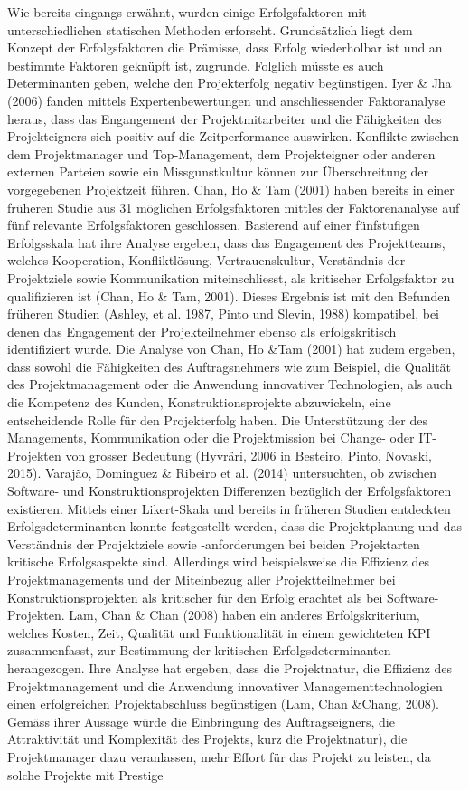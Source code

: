 \newline
Wie bereits eingangs erwähnt, wurden einige Erfolgsfaktoren mit unterschiedlichen statischen Methoden erforscht. Grundsätzlich liegt dem Konzept der Erfolgsfaktoren die Prämisse, dass Erfolg wiederholbar ist und an bestimmte Faktoren geknüpft ist, zugrunde. Folglich müsste es auch Determinanten geben, welche den Projekterfolg negativ begünstigen. Iyer \& Jha (2006) fanden mittels Expertenbewertungen und anschliessender Faktoranalyse heraus, dass das Engangement der Projektmitarbeiter und die Fähigkeiten des Projekteigners sich positiv auf die Zeitperformance auswirken. Konflikte zwischen dem Projektmanager und Top-Management, dem Projekteigner oder anderen externen Parteien sowie ein Missgunstkultur können zur Überschreitung der vorgegebenen Projektzeit führen. Chan, Ho \& Tam (2001) haben bereits in einer früheren Studie aus 31 möglichen Erfolgsfaktoren mittles der Faktorenanalyse auf fünf relevante Erfolgsfaktoren geschlossen. Basierend auf einer fünfstufigen Erfolgsskala hat ihre Analyse ergeben, dass das Engagement des Projektteams, welches Kooperation, Konfliktlösung, Vertrauenskultur, Verständnis der Projektziele sowie Kommunikation miteinschliesst, als kritischer Erfolgsfaktor zu qualifizieren ist (Chan, Ho \& Tam, 2001). Dieses Ergebnis ist mit den Befunden früheren Studien (Ashley, et al. 1987, Pinto und Slevin, 1988) kompatibel, bei denen das Engagement der Projekteilnehmer ebenso als erfolgskritisch identifiziert wurde. Die Analyse von Chan, Ho \&Tam (2001) hat zudem ergeben, dass sowohl die Fähigkeiten des Auftragsnehmers wie zum Beispiel, die Qualität des Projektmanagement oder die Anwendung innovativer Technologien, als auch die Kompetenz des Kunden, Konstruktionsprojekte abzuwickeln, eine entscheidende Rolle für den Projekterfolg haben. Die Unterstützung der des Managements, Kommunikation oder die Projektmission bei Change- oder IT-Projekten von grosser Bedeutung (Hyvräri, 2006 in Besteiro, Pinto, Novaski, 2015). Varajão, Dominguez \& Ribeiro et al. (2014) untersuchten, ob zwischen Software- und Konstruktionsprojekten Differenzen bezüglich der Erfolgsfaktoren existieren. Mittels einer Likert-Skala und bereits in früheren Studien entdeckten Erfolgsdeterminanten konnte festgestellt werden, dass die Projektplanung und das Verständnis der Projektziele sowie -anforderungen bei beiden Projektarten kritische Erfolgsaspekte sind. Allerdings wird beispielsweise die Effizienz des Projektmanagements und der Miteinbezug aller Projektteilnehmer bei Konstruktionsprojekten als kritischer für den Erfolg erachtet als bei Software-Projekten. Lam, Chan \& Chan (2008) haben ein anderes Erfolgskriterium, welches Kosten, Zeit, Qualität und Funktionalität in einem gewichteten KPI zusammenfasst, zur Bestimmung der kritischen Erfolgsdeterminanten herangezogen. Ihre Analyse hat ergeben, dass die Projektnatur, die Effizienz des Projektmanagement und die Anwendung innovativer Managementtechnologien einen erfolgreichen Projektabschluss begünstigen (Lam, Chan \&Chang, 2008). Gemäss ihrer Aussage würde die Einbringung des Auftragseigners, die Attraktivität und Komplexität des Projekts, kurz die Projektnatur), die Projektmanager dazu veranlassen, mehr Effort für das Projekt zu leisten, da solche Projekte mit Prestige 
